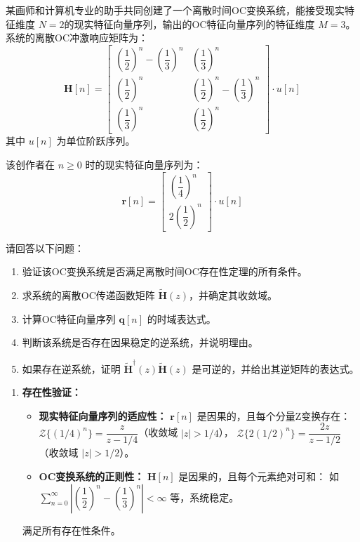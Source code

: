\begin{example}[离散时间OC变换综合题]

    某画师和计算机专业的助手共同创建了一个离散时间OC变换系统，能接受现实特征维度 $N=2$的现实特征向量序列，输出的OC特征向量序列的特征维度 $M=3$。系统的离散OC冲激响应矩阵为：
    \begin{equation}
        \mathbf{H}[n] = \begin{bmatrix}
            \left(\dfrac{1}{2}\right)^n - \left(\dfrac{1}{3}\right)^n & \left(\dfrac{1}{3}\right)^n                               \\
            \left(\dfrac{1}{2}\right)^n                               & \left(\dfrac{1}{2}\right)^n - \left(\dfrac{1}{3}\right)^n \\
            \left(\dfrac{1}{3}\right)^n                               & \left(\dfrac{1}{2}\right)^n
        \end{bmatrix} \cdot u[n]
    \end{equation}
    其中 $u[n]$ 为单位阶跃序列。

    该创作者在 $n \geq 0$ 时的现实特征向量序列为：
    \begin{equation}
        \mathbf{r}[n] = \begin{bmatrix}
            \left(\dfrac{1}{4}\right)^n \\ 2\left(\dfrac{1}{2}\right)^n
        \end{bmatrix} \cdot u[n]
    \end{equation}

    请回答以下问题：
    \begin{enumerate}
        \item 验证该OC变换系统是否满足离散时间OC存在性定理的所有条件。
        \item 求系统的离散OC传递函数矩阵 $\tilde{\mathbf{H}}(z)$，并确定其收敛域。
        \item 计算OC特征向量序列 $\mathbf{q}[n]$ 的时域表达式。
        \item 判断该系统是否存在因果稳定的逆系统，并说明理由。
        \item 如果存在逆系统，证明 $\tilde{\mathbf{H}}^\dagger(z)\tilde{\mathbf{H}}(z)$ 是可逆的，并给出其逆矩阵的表达式。
    \end{enumerate}

    \solution
    \begin{enumerate}
        \item \textbf{存在性验证：}
              \begin{itemize}
                  \item \textbf{现实特征向量序列的适应性：} $\mathbf{r}[n]$ 是因果的，且每个分量Z变换存在：
                        $\mathcal{Z}\{(1/4)^n\} = \dfrac{z}{z-1/4}$（收敛域 $|z|>1/4$），
                        $\mathcal{Z}\{2(1/2)^n\} = \dfrac{2z}{z-1/2}$（收敛域 $|z|>1/2$）。
                  \item \textbf{OC变换系统的正则性：} $\mathbf{H}[n]$ 是因果的，且每个元素绝对可和：
                        如 $\displaystyle\sum_{n=0}^\infty \left|\left(\dfrac{1}{2}\right)^n - \left(\dfrac{1}{3}\right)^n\right| < \infty$ 等，系统稳定。
              \end{itemize}
              满足所有存在性条件。


\end{enumerate}
\end{example}
